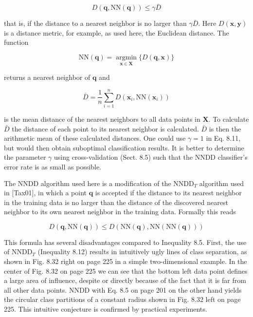 \documentclass[10pt]{article}
\begin{document}
\begin{equation*}
D(\boldsymbol{q}, \mathrm{NN}(\boldsymbol{q})) \leq \gamma \bar{D} \tag{8.11}
\end{equation*}


that is, if the distance to a nearest neighbor is no larger than $\gamma \bar{D}$. Here $D(\boldsymbol{x}, \boldsymbol{y})$ is a distance metric, for example, as used here, the Euclidean distance. The function

$$
\mathrm{NN}(\boldsymbol{q})=\underset{\boldsymbol{x} \in \boldsymbol{X}}{\operatorname{argmin}}\{D(\boldsymbol{q}, \boldsymbol{x})\}
$$

returns a nearest neighbor of $\boldsymbol{q}$ and

$$
\bar{D}=\frac{1}{n} \sum_{i=1}^{n} D\left(\boldsymbol{x}_{i}, \mathrm{NN}\left(\boldsymbol{x}_{i}\right)\right)
$$

is the mean distance of the nearest neighbors to all data points in $\boldsymbol{X}$. To calculate $\bar{D}$ the distance of each point to its nearest neighbor is calculated. $\bar{D}$ is then the arithmetic mean of these calculated distances. One could use $\gamma=1$ in Eq. 8.11, but would then obtain suboptimal classification results. It is better to determine the parameter $\gamma$ using cross-validation (Sect. 8.5) such that the NNDD classifier's error rate is as small as possible.

The NNDD algorithm used here is a modification of the $\mathrm{NNDD}_{T}$ algorithm used in [Tax01], in which a point $\boldsymbol{q}$ is accepted if the distance to its nearest neighbor in the training data is no larger than the distance of the discovered nearest neighbor to its own nearest neighbor in the training data. Formally this reads


\begin{equation*}
D(\boldsymbol{q}, \mathrm{NN}(\boldsymbol{q})) \leq D(\mathrm{NN}(\boldsymbol{q}), \mathrm{NN}(\mathrm{NN}(\boldsymbol{q}))) \tag{8.12}
\end{equation*}


This formula has several disadvantages compared to Inequality 8.5. First, the use of $\mathrm{NNDD}_{T}$ (Inequality 8.12) results in intuitively ugly lines of class separation, as shown in Fig. 8.32 right on page 225 in a simple two-dimensional example. In the center of Fig. 8.32 on page 225 we can see that the bottom left data point defines a large area of influence, despite or directly because of the fact that it is far from all other data points. NNDD with Eq. 8.5 on page 201 on the other hand yields the circular class partitions of a constant radius shown in Fig. 8.32 left on page 225. This intuitive conjecture is confirmed by practical experiments.
\end{document}

